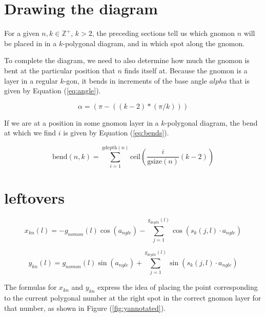 \documentclass[notitlepage]{report}
\begin{document}
\section*{Drawing the diagram}

For a given $n,k \in \mathbb{Z}^{+}$, $k > 2$, the preceding sections tell us which gnomon $n$ will be placed in in a $k$-polygonal diagram, and in which spot along the gnomon. 

To complete the diagram, we need to also determine how much the gnomon is bent at the particular position that $n$ finds itself at. Because the gnomon is a layer in a regular $k$-gon, it bends in increments of the base angle $alpha$ that is given by Equation (\ref{eq:angle}).


\begin{equation}
    \alpha=\left(\pi-((k-2)*(\pi/k))\right)
\label{eq:angle}
\end{equation}

If we are at a position in some gnomon layer in a $k$-polygonal diagram, the bend at which we find $i$ is given by Equation (\ref{eq:bends}).

\begin{equation}
\text{bend}\left(n,k\right)=\sum_{i=1}^{\text{gdepth}\left(n\right)}\text{ceil}\left(\frac{i}{\text{gsize}\left(n\right)}\left(k-2\right)\right)
\label{eq:bends}
\end{equation}


\section*{leftovers}

\begin{equation}
x_{kn}\left(l\right)=-g_{nomon}\left(l\right)\cos\left(a_{ngle}\right)-\sum_{j=1}^{g_{depth}\left(l\right)}\cos\left(s_{k}\left(j,l\right)\cdot a_{ngle}\right)
\end{equation}

\begin{equation}    y_{kn}\left(l\right)=g_{nomon}\left(l\right)\sin\left(a_{ngle}\right)+\sum_{j=1}^{g_{depth}\left(l\right)}\sin\left(s_{k}\left(j,l\right)\cdot a_{ngle}\right)
\label{eq:yformula}
\end{equation}

The formulas for $x_{kn}$ and $y_{kn}$ express the idea of placing the point corresponding to the current polygonal number at the right spot in the correct gnomon layer for that number, as shown in Figure (\ref{fig:yannotated}).
\end{document}
